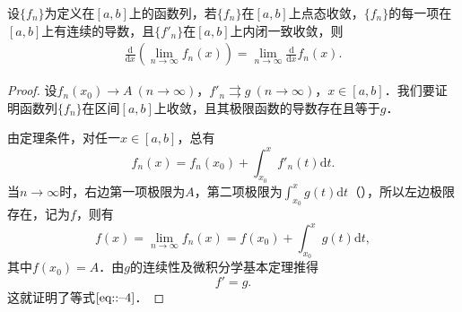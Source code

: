 \documentclass[../../main.tex]{subfiles}%
\begin{document}
\begin{theorem}[可微性]\label{theorem:函数项级数的逐项可微性}
设\(\{f_n\}\)为定义在\([a, b]\)上的函数列，若\(\{f_n\}\)在$[a, b]$上点态收敛，\(\{f_n\}\)的每一项在\([a, b]\)上有连续的导数，且\(\{f'_n\}\)在\([a, b]\)上内闭一致收敛，则
\begin{align}
\frac{\mathrm{d}}{\mathrm{d}x} \left( \lim_{n \to \infty} f_n(x) \right) = \lim_{n \to \infty} \frac{\mathrm{d}}{\mathrm{d}x} f_n(x). \label{eq::--4}
\end{align}
\end{theorem}
\begin{proof}
设\(f_n(x_0) \to A \ (n \to \infty)\)，\(f'_n \rightrightarrows g \ (n \to \infty)\)，\(x \in [a, b]\)．我们要证明函数列\(\{f_n\}\)在区间\([a, b]\)上收敛，且其极限函数的导数存在且等于\(g\)．

由定理条件，对任一\(x \in [a, b]\)，总有
\[
f_n(x) = f_n(x_0) + \int_{x_0}^x f'_n(t) \mathrm{d}t.
\]
当\(n \to \infty\)时，右边第一项极限为\(A\)，第二项极限为\(\int_{x_0}^x g(t) \mathrm{d}t\)（），所以左边极限存在，记为\(f\)，则有
\[
f(x) = \lim_{n \to \infty} f_n(x) = f(x_0) + \int_{x_0}^x g(t) \mathrm{d}t,
\]其中\(f(x_0) = A\)．由\(g\)的连续性及微积分学基本定理推得
\[
f' = g.
\]
这就证明了等式\(\eqref{eq::--4}\)．
\end{proof}
\end{document}
